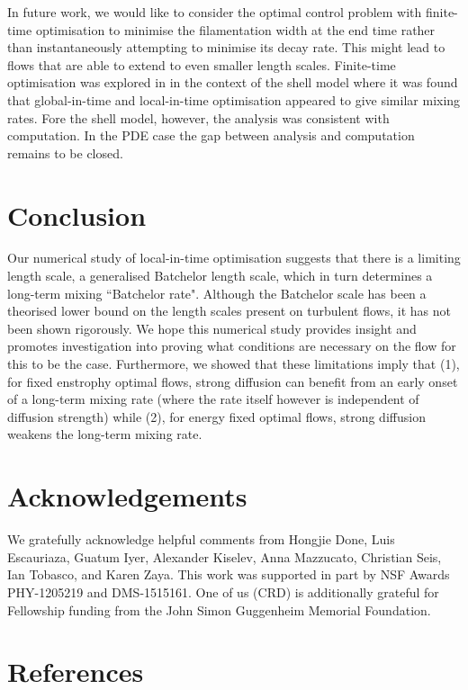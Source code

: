 \documentclass[12pt]{iopart}
\begin{document}
In future work, we would like to consider the optimal control problem with finite-time optimisation to minimise the filamentation width at the end time rather than instantaneously attempting to minimise its decay rate. This might lead to flows that are able to extend to even smaller length scales. Finite-time optimisation was explored in \cite{Miles2017a} in the context of the shell model where it was found that global-in-time and local-in-time optimisation appeared to give similar mixing rates. Fore the shell model, however, the analysis was consistent with computation. In the PDE case the gap between analysis and computation remains to be closed.




\section{Conclusion}
\label{sec:conclusion}


Our numerical study of local-in-time optimisation suggests that there is a limiting length scale, a generalised Batchelor length scale, which in turn determines a long-term mixing ``Batchelor rate". Although the Batchelor scale has been a theorised lower bound on the length scales present on turbulent flows, it has not been shown rigorously. We hope this numerical study provides insight and promotes investigation into proving what conditions are necessary on the flow for this to be the case. Furthermore, we showed that these limitations imply that (1), for fixed enstrophy optimal flows, strong diffusion can benefit from an early onset of a long-term mixing rate (where the rate itself however is independent of diffusion strength) while (2), for energy fixed optimal flows, strong diffusion weakens the long-term mixing rate.  


\section*{Acknowledgements}
We gratefully acknowledge helpful comments from Hongjie Done, Luis Escauriaza, Guatum Iyer, Alexander Kiselev, Anna Mazzucato, Christian Seis, Ian Tobasco, and Karen Zaya. This work was supported in part by NSF Awards PHY-1205219 and DMS-1515161. One of us (CRD) is additionally grateful for Fellowship funding from the John Simon Guggenheim Memorial Foundation. 

 

\section*{References}


\end{document}
